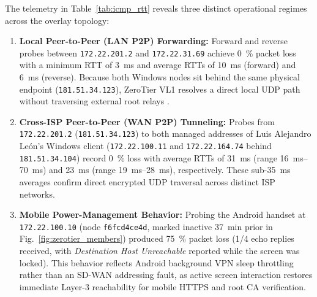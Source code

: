 The telemetry in Table~\ref{tab:icmp_rtt} reveals three distinct operational regimes across the overlay topology:
\begin{enumerate}
    \item \textbf{Local Peer-to-Peer (LAN P2P) Forwarding:} Forward and reverse probes between \texttt{172.22.201.2} and \texttt{172.22.31.69} achieve \qty{0}{\percent} packet loss with a minimum RTT of \qty{3}{\milli\second} and average RTTs of \qty{10}{\milli\second} (forward) and \qty{6}{\milli\second} (reverse). Because both Windows nodes sit behind the same physical endpoint (\texttt{181.51.34.123}), ZeroTier VL1 resolves a direct local UDP path without traversing external root relays \cite{zerotier2024}.
    \item \textbf{Cross-ISP Peer-to-Peer (WAN P2P) Tunneling:} Probes from \texttt{172.22.201.2} (\texttt{181.51.34.123}) to both managed addresses of Luis Alejandro Le\'{o}n's Windows client (\texttt{172.22.100.11} and \texttt{172.22.164.74} behind \texttt{181.51.34.104}) record \qty{0}{\percent} loss with average RTTs of \qty{31}{\milli\second} (range \qtyrange{16}{70}{\milli\second}) and \qty{23}{\milli\second} (range \qtyrange{19}{28}{\milli\second}), respectively. These sub-\qty{35}{\milli\second} averages confirm direct encrypted UDP traversal across distinct ISP networks.
    \item \textbf{Mobile Power-Management Behavior:} Probing the Android handset at \texttt{172.22.100.10} (node \texttt{f6fcd4ce4d}, marked inactive \qty{37}{\minute} prior in Fig.~\ref{fig:zerotier_members}) produced \qty{75}{\percent} packet loss (\num{1}/\num{4} echo replies received, with \textit{Destination Host Unreachable} reported while the screen was locked). This behavior reflects Android background VPN sleep throttling rather than an SD-WAN addressing fault, as active screen interaction restores immediate Layer-3 reachability for mobile HTTPS and root CA verification.
\end{enumerate}
